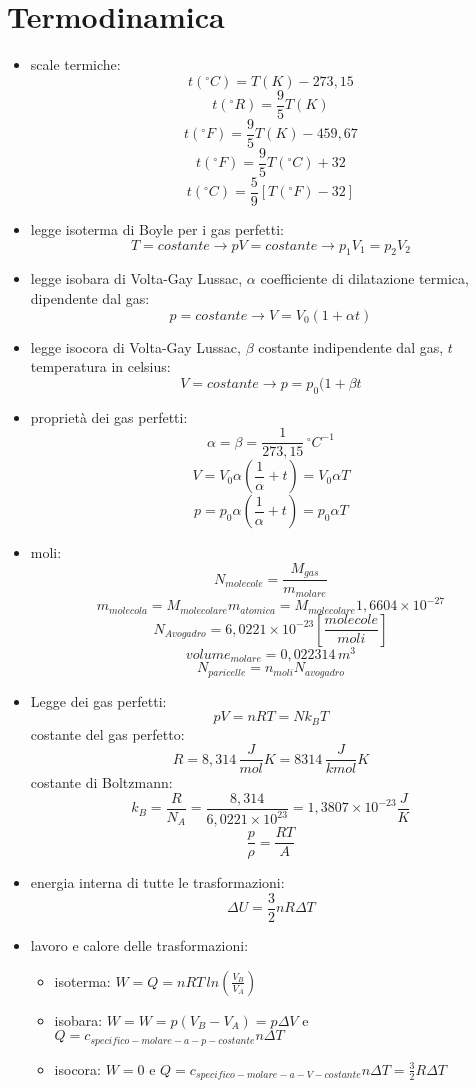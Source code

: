 \documentclass[a4paper,12pt, oneside]{book}
\begin{document}
\section{Termodinamica}
\begin{itemize}
	\item scale termiche:
	      $$t(^{\circ}C)=T(K)-273,15$$
	      $$t(^{\circ}R)=\frac{9}{5} T(K)$$
	      $$t(^{\circ}F)=\frac{9}{5} T(K)-459,67$$
	      $$t(^{\circ}F)=\frac{9}{5} T(^{\circ}C)+32$$
	      $$t(^{\circ}C)=\frac{5}{9} [T(^{\circ}F)-32]$$
	\item legge isoterma di Boyle per i gas perfetti:
	      $$T=costante\to pV=costante\to p_1V_1=p_2V_2$$
	\item legge isobara di Volta-Gay Lussac, $\alpha$ coefficiente di dilatazione termica, dipendente dal gas:
	      $$p=costante\to V=V_0(1+\alpha t)$$
	\item legge isocora di Volta-Gay Lussac, $\beta$ costante indipendente dal gas, $t$ temperatura in celsius:
	      $$V=costante\to p=p_0(1+\beta t$$
	\item proprietà dei gas perfetti:
	      $$\alpha=\beta=\frac{1}{273,15} {\,}^\circ C^{-1}$$
	      $$V=V_0\alpha\left(\frac{1}{\alpha}+t\right)=V_0\alpha T$$
	      $$p=p_0\alpha\left(\frac{1}{\alpha}+t\right)=p_0\alpha T$$
	\item moli:
	      $$N_{molecole}=\frac{M_{gas}}{m_{molare}}$$
	      $$m_{molecola}=M_{molecolare}m_{atomica}=M_{molecolare}1,6604\times 10^{-27}$$
	      $$N_{Avogadro}=6,0221\times 10^{-23}\left[\frac{molecole}{moli}\right]$$
	      $$volume_{molare}=0,022314\,m^3$$
	      $$N_{paricelle}=n_{moli}N_{avogadro}$$
	\item Legge dei gas perfetti:
	      $$pV=nRT=Nk_BT$$
	      costante del gas perfetto:
	      $$R=8,314\,\frac{J}{mol}K=8314\,\frac{J}{kmol}K$$
	      costante di Boltzmann:
	      $$k_B=\frac{R}{N_A}=\frac{8,314}{6,0221\times 10^{23}}=1,3807\times 10^{-23}\frac{J}{K}$$
	      $$\frac{p}{\rho}=\frac{RT}{A}$$
	\item energia interna di tutte le trasformazioni:
	      $$\Delta U=\frac{3}{2}nR\Delta T$$
	\item lavoro e calore delle trasformazioni:
	      \begin{itemize}
		      \item isoterma: $W=Q=nRT\,ln\left(\frac{V_B}{V_A}\right)$
		      \item isobara: $W=W=p(V_B-V_A)=p\Delta V$ e
		            $Q=c_{specifico-molare-a-p-costante}n\Delta T$
		      \item isocora: $W=0$ e $Q=c_{specifico-molare-a-V-costante}n\Delta T=\frac{3}{2}R\Delta T$

\end{itemize}
\end{itemize}
\end{document}
